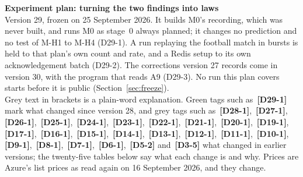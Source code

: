 \documentclass[11pt]{article}
\newcommand{\chg}[1]{\,{\color{chgcol}\bfseries\footnotesize[#1]}}
\newcommand{\chgold}[1]{\,{\color{oldcol}\bfseries\footnotesize[#1]}}
\begin{document}
{\LARGE\bfseries Experiment plan: turning the two findings into laws}\\[3pt]
{\large Version 29, frozen on 25 September 2026. It builds M0's recording, which was never built, and runs M0 as stage~0 always planned; it changes no prediction and no test of M-H1 to M-H4 (D29-1). A run replaying the football match in bursts is held to that plan's own count and rate, and a Redis setup to its own acknowledgement batch (D29-2). The corrections version 27 records come in version 30, with the program that reads A9 (D29-3). No run this plan covers starts before it is public (Section~\ref{sec:freeze}).}\\[2pt]
{\color{soft}\small Grey text in brackets is a plain-word explanation. Green tags such as \chg{D29-1} mark what changed since version 28, and grey tags such as \chgold{D28-1}, \chgold{D27-1}, \chgold{D26-1}, \chgold{D25-1}, \chgold{D24-1}, \chgold{D23-1}, \chgold{D22-1}, \chgold{D21-1}, \chgold{D20-1}, \chgold{D19-1}, \chgold{D17-1}, \chgold{D16-1}, \chgold{D15-1}, \chgold{D14-1}, \chgold{D13-1}, \chgold{D12-1}, \chgold{D11-1}, \chgold{D10-1}, \chgold{D9-1}, \chgold{D8-1}, \chgold{D7-1}, \chgold{D6-1}, \chgold{D5-2} and \chgold{D3-5} what changed in earlier versions; the twenty-five tables below say what each change is and why. Prices are Azure's list prices as read again on 16 September 2026, and they change.}
\end{document}
